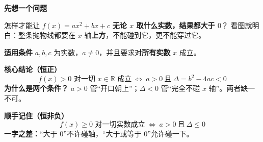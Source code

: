 \begin{statementbox}
  \textbf{\textcolor{CStatement}{先想一个问题}}

  怎样才能让 $f(x)=ax^2+bx+c$ \textbf{无论 $x$ 取什么实数，结果都大于 $0$}？
  看图就明白：整条抛物线都要在 $x$ 轴\textbf{上方}，不能碰到它，更不能穿过它。

  \medskip
  \textbf{\textcolor{CStatement}{适用条件}}
  $a,b,c$ 为实数，$a\ne0$，并且要求对\textbf{所有实数} $x$ 成立。

  \medskip
  \textbf{\textcolor{CStatement}{核心结论（恒正）}}
  \[
    \boxed{\ f(x)>0\text{ 对一切 }x\in\mathbb R\text{ 成立}\ \Longleftrightarrow\ a>0\ \text{且}\ \Delta=b^2-4ac<0\ }
  \]
  \textbf{为什么是两个条件？} $a>0$ 管“开口朝上”；$\Delta<0$ 管“完全不碰 $x$ 轴”。两者缺一不可。

  \begin{center}
  
  \end{center}

  \textbf{\textcolor{CStatement}{顺手记住（恒非负）}}
  \[
    \boxed{\ f(x)\ge0\text{ 对一切实数成立}\ \Longleftrightarrow\ a>0\ \text{且}\ \Delta\le0\ }
  \]
  \textbf{一字之差：}“大于 $0$”不许碰轴，“大于或等于 $0$”允许碰一下。
\end{statementbox}
